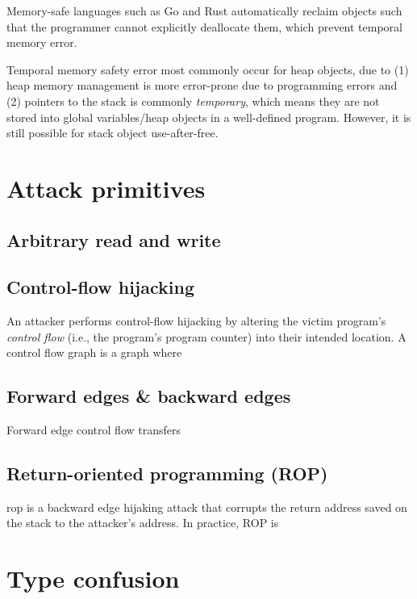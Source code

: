 \documentclass[11pt]{memoir}
\begin{document}
Memory-safe languages such as Go and Rust automatically reclaim objects such
that the programmer cannot explicitly deallocate them, which prevent temporal
memory error.


Temporal memory safety error most commonly occur for heap objects, due to (1)
heap memory management is more error-prone due to programming errors and (2)
pointers to the stack is commonly \emph{temporary}, which means they are not
stored into global variables/heap objects in a well-defined program.
However, it is still possible for stack object use-after-free.


%










\section{Attack primitives}
\subsection{Arbitrary read and write}

\subsection{Control-flow hijacking}
An attacker performs control-flow hijacking by altering the victim program's \emph{control flow} (i.e., the program's program counter) into their intended location. 
A control flow graph is a graph where

\subsection{Forward edges \& backward edges}

Forward edge control flow transfers

\subsection{Return-oriented programming (ROP)}
\gls{rop} is a backward edge hijaking attack that corrupts the return address saved on the stack to the attacker's address.
In practice, ROP is

\section{Type confusion}
\end{document}
